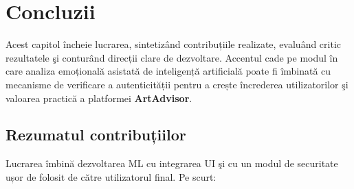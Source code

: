 \chapter{Concluzii}
\label{ch:concluzii}

Acest capitol încheie lucrarea, sintetizând contribuțiile realizate, evaluând critic rezultatele şi conturând direcții clare de dezvoltare. Accentul cade pe modul în care analiza emoțională asistată de inteligență artificială poate fi îmbinată cu mecanisme de verificare a autenticității pentru a crește încrederea utilizatorilor şi valoarea practică a platformei \textbf{ArtAdvisor}.

\section{Rezumatul contribuțiilor}
Lucrarea îmbină dezvoltarea ML cu integrarea UI şi cu un modul de securitate ușor de folosit de către utilizatorul final. Pe scurt:
